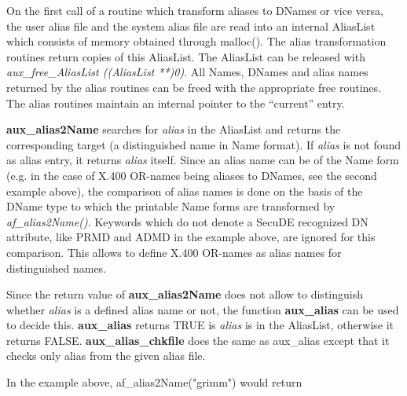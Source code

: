 On the first call of a routine which transform aliases to DNames or vice versa, the user 
alias file and the system alias file are read into an internal AliasList which
consists of memory obtained through malloc(). The alias transformation
routines return copies of this AliasList. The AliasList can be released
with {\em aux\_free\_AliasList ((AliasList **)0)}. All Names, DNames and alias names returned by 
the alias routines can be freed with the appropriate free routines. The alias routines 
maintain an internal pointer to the ``current'' entry.  

{\bf aux\_alias2Name} searches for {\em alias} in the AliasList
and returns the corresponding target
(a distinguished name in Name format). If {\em alias}
is not found as alias entry, it returns {\em alias} itself. Since an alias name can be
of the Name form (e.g. in the case of X.400 OR-names being aliases to DNames, see the second 
example above), the comparison of alias names is done on the basis of the DName type to which
the printable Name forms are transformed by {\em af\_alias2Name()}.
Keywords which do not
denote a SecuDE recognized DN attribute, like PRMD and ADMD in the example above,
are ignored for this comparison. This allows to define X.400 OR-names as alias names
for distinguished names.

Since the return value of {\bf aux\_alias2Name} does not allow to distinguish whether
{\em alias} is a defined alias name or not, the function {\bf aux\_alias} can be
used to decide this. {\bf aux\_alias} returns TRUE is {\em alias} is in the AliasList,
otherwise it returns FALSE. {\bf aux\_alias\_chkfile} does the same as aux\_alias
except that it checks only alias from the given alias file.

In the example above, af\_alias2Name("grimm") would return 

